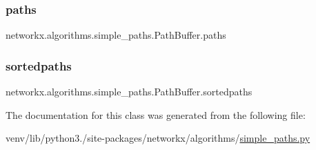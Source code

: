 \subsubsection{\texorpdfstring{paths}{paths}}
{\footnotesize\ttfamily networkx.\+algorithms.\+simple\+\_\+paths.\+Path\+Buffer.\+paths}

\mbox{\label{classnetworkx_1_1algorithms_1_1simple__paths_1_1PathBuffer_a8fbb95735efceb3125037c6fd3f09aaa}} 
\subsubsection{\texorpdfstring{sortedpaths}{sortedpaths}}
{\footnotesize\ttfamily networkx.\+algorithms.\+simple\+\_\+paths.\+Path\+Buffer.\+sortedpaths}



The documentation for this class was generated from the following file\+:\begin{DoxyCompactItemize}
\item 
venv/lib/python3./site-\/packages/networkx/algorithms/\hyperlink{simple__paths_8py}{simple\+\_\+paths.\+py}\end{DoxyCompactItemize}
